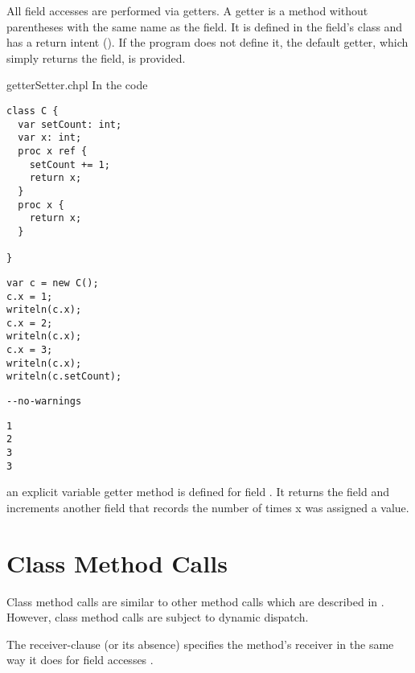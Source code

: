 All field accesses are performed via getters.  A getter is a method without
parentheses with the same name as the field. It is defined in the field's class
and has a  return intent ().  If the program
does not define it, the default getter, which simply returns the field, is
provided.

\begin{chapelexample}{getterSetter.chpl}
In the code
\begin{chapel}
\begin{verbatim}
class C {
  var setCount: int;
  var x: int;
  proc x ref {
    setCount += 1;
    return x;
  }
  proc x {
    return x;
  }

}
\end{verbatim}
\end{chapel}
\begin{chapelpost}
\begin{verbatim}
var c = new C();
c.x = 1;
writeln(c.x);
c.x = 2;
writeln(c.x);
c.x = 3;
writeln(c.x);
writeln(c.setCount);
\end{verbatim}
\end{chapelpost}
\begin{chapelcompopts}
\begin{verbatim}
--no-warnings
\end{verbatim}
\end{chapelcompopts}
\begin{chapeloutput}
\begin{verbatim}
1
2
3
3
\end{verbatim}
\end{chapeloutput}
an explicit variable getter method is defined for field .  It
returns the field  and increments another field that records
the number of times x was assigned a value.
\end{chapelexample}

\section{Class Method Calls}
\label{Class_Method_Calls}

Class method calls are similar to other method calls which are described
in . However, class method calls are subject to
dynamic dispatch.

The receiver-clause (or its absence) specifies the method's receiver in
the same way it does for field accesses .

